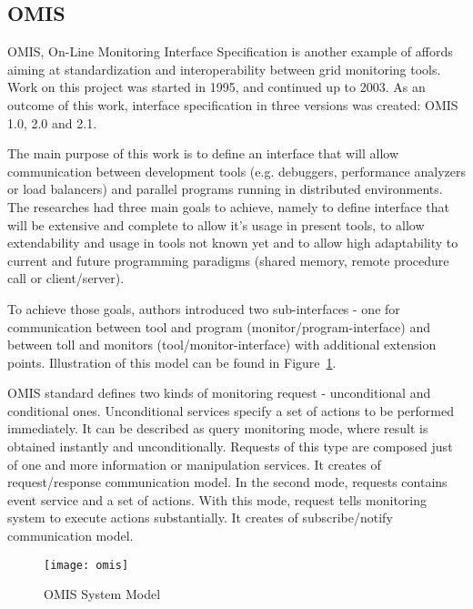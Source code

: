 
\subsection{OMIS}
\label{ssec:omis}
OMIS, On-Line Monitoring Interface Specification is another example of affords aiming at standardization and interoperability between grid monitoring tools. Work on this project was started in 1995, and continued up to 2003. As an outcome of this work, interface specification in three versions was created: OMIS 1.0\cite{OMIS1}, 2.0\cite{OMIS2} and 2.1.

The main purpose of this work is to define an interface that will allow communication between development tools (e.g. debuggers, performance analyzers or load balancers) and parallel programs running in distributed environments. The researches had three main goals to achieve, namely to define interface that will be extensive and complete to allow it\rq{}s usage in present tools, to allow extendability and usage in tools not known yet and to allow high adaptability to current and future programming paradigms (shared memory, remote procedure call or client/server).

To achieve those goals, authors introduced two sub-interfaces - one for communication between tool and program (monitor/program-interface) and between toll and monitors (tool/monitor-interface) with additional extension points. Illustration of this model can be found in Figure~\ref{fig:omis}. 

OMIS standard defines two kinds of monitoring request - unconditional and conditional ones. Unconditional services specify a set of actions to be performed immediately. It can be described as query monitoring mode, where result is obtained instantly and unconditionally. Requests of this type are composed just of one and more information or manipulation services. It creates of request/response communication model. In the second mode, requests contains event service and a set of actions. With this mode, request tells monitoring system to execute actions substantially. It creates of subscribe/notify communication model.

\begin{figure}[ht]
  \centering
  \texttt{[image: omis]}
  \caption{OMIS System Model}
  \label{fig:omis}
\end{figure}
  


